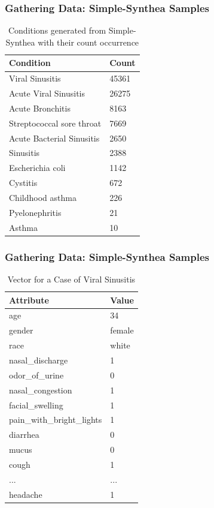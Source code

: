 \documentclass{beamer}
\begin{document}
	\begin{frame}
		\frametitle{Gathering Data: Simple-Synthea  Samples}
		\begin{table}
			\begin{tabular}{l l}
				\toprule
				\textbf{Condition} & \textbf{Count}\\
				\midrule
				Viral Sinusitis &45361  \\
				Acute Viral Sinusitis & 26275 \\
				Acute Bronchitis & 8163 \\
				Streptococcal sore throat  & 7669 \\
				Acute Bacterial Sinusitis & 2650 \\
				Sinusitis & 2388 \\
				Escherichia coli & 1142 \\
				Cystitis &  672 \\
				Childhood asthma &226 \\
				Pyelonephritis &  21 \\
				Asthma &  10  \\
				\bottomrule
			\end{tabular}
			\caption{Conditions generated from Simple-Synthea with their count occurrence }
		\end{table}
	\end{frame}

	\begin{frame}
	\frametitle{Gathering Data: Simple-Synthea  Samples}
	\begin{table}
		\begin{tabular}{l l}
			\toprule
			\textbf{Attribute} & \textbf{Value}\\
			\midrule
			age&34\\
			gender&female\\
			race&white\\
			nasal\_discharge&1\\
			odor\_of\_urine&0\\
			nasal\_congestion&1\\
			facial\_swelling&1\\
			pain\_with\_bright\_lights&1\\
			diarrhea&0\\
			mucus&0\\
			cough&1\\
			... & ... \\
			headache&1\\
			\bottomrule
		\end{tabular}
		\caption{Vector for a Case of Viral Sinusitis}
	\end{table}
\end{frame}
	
\end{document}
